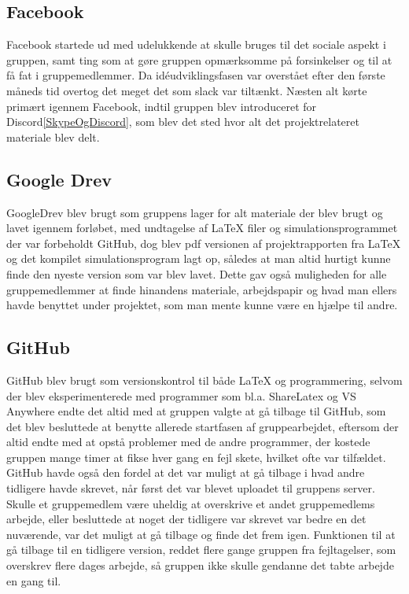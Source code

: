 \subsection{Facebook}\label{Facebook}
Facebook startede ud med udelukkende at skulle bruges til det sociale aspekt i gruppen, samt ting som at gøre gruppen opmærksomme på forsinkelser og til at få fat i gruppemedlemmer. Da idéudviklingsfasen var overstået efter den første måneds tid overtog det meget det som slack var tiltænkt. Næsten alt kørte primært igennem Facebook, indtil gruppen blev introduceret for Discord\ref{SkypeOgDiscord}, som blev det sted hvor alt det projektrelateret materiale blev delt.      

\subsection{Google Drev}\label{GoogleDrev}
GoogleDrev blev brugt som gruppens lager for alt materiale der blev brugt og lavet igennem forløbet, med undtagelse af LaTeX filer og simulationsprogrammet der var forbeholdt GitHub, dog blev pdf versionen af projektrapporten fra LaTeX og det kompilet simulationsprogram lagt op, således at man altid hurtigt kunne finde den nyeste version som var blev lavet. Dette gav også muligheden for alle gruppemedlemmer at finde hinandens materiale, arbejdspapir og hvad man ellers havde benyttet under projektet, som man mente kunne være en hjælpe til andre.

\subsection{GitHub}\label{GitHub}
GitHub blev brugt som versionskontrol til både LaTeX og programmering, selvom der blev eksperimenterede med programmer som bl.a. ShareLatex og VS Anywhere endte det altid med at gruppen valgte at gå tilbage til GitHub, som det blev besluttede at benytte allerede startfasen af gruppearbejdet, eftersom der altid endte med at opstå problemer med de andre programmer, der kostede gruppen mange timer at fikse hver gang en fejl skete, hvilket ofte var tilfældet. GitHub havde også den fordel at det var muligt at gå tilbage i hvad andre tidligere havde skrevet, når først det var blevet uploadet til gruppens server. Skulle et gruppemedlem være uheldig at overskrive et andet gruppemedlems arbejde, eller besluttede at noget der tidligere var skrevet var bedre en det nuværende, var det muligt at gå tilbage og finde det frem igen. Funktionen til at gå tilbage til en tidligere version, reddet flere gange gruppen fra fejltagelser, som overskrev flere dages arbejde, så gruppen ikke skulle gendanne det tabte arbejde en gang til. 

